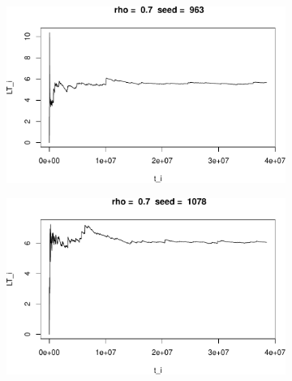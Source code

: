 \documentclass[]{article}
\begin{document}
\begin{figure}[h!]
\begin{subfigure}[b]{.55\linewidth}

\includegraphics[width=\linewidth]{003_files/figure-latex/unnamed-chunk-17-3.pdf}
\end{subfigure}\hfill
\begin{subfigure}[b]{.55\linewidth}
\includegraphics[width=\linewidth]{003_files/figure-latex/unnamed-chunk-17-4.pdf}
\end{subfigure}\vfill
\end{figure}
\end{document}
